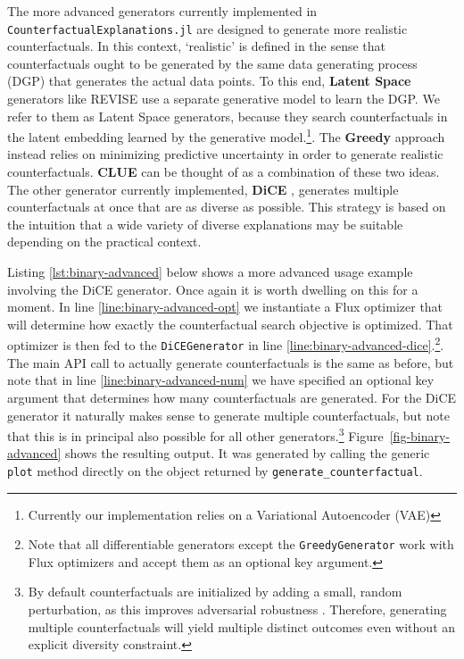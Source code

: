 \documentclass{juliacon}
\begin{document}
The more advanced generators currently implemented in
\texttt{CounterfactualExplanations.jl} are designed to generate more
realistic counterfactuals. In this context, `realistic' is defined in
the sense that counterfactuals ought to be generated by the same data
generating process (DGP) that generates the actual data points. To this
end, \textbf{Latent Space} generators like REVISE
\cite{joshi2019realistic} use a separate generative model to learn the
DGP. We refer to them as Latent Space generators, because they search
counterfactuals in the latent embedding learned by the generative
model.\footnote{Currently our implementation relies on a Variational
  Autoencoder (VAE)}. The \textbf{Greedy} approach
\cite{schut2021generating} instead relies on minimizing predictive
uncertainty in order to generate realistic counterfactuals.
\textbf{CLUE} \cite{antoran2020getting} can be thought of as a
combination of these two ideas. The other generator currently
implemented, \textbf{DiCE} \cite{mothilal2020explaining}, generates
multiple counterfactuals at once that are as diverse as possible. This
strategy is based on the intuition that a wide variety of diverse
explanations may be suitable depending on the practical context.

Listing \ref{lst:binary-advanced} below shows a more advanced usage
example involving the DiCE generator. Once again it is worth dwelling on
this for a moment. In line \ref{line:binary-advanced-opt} we instantiate
a Flux optimizer that will determine how exactly the counterfactual
search objective is optimized. That optimizer is then fed to the
\texttt{DiCEGenerator} in line
\ref{line:binary-advanced-dice}.\footnote{Note that all differentiable
  generators except the \texttt{GreedyGenerator} work with Flux
  optimizers and accept them as an optional key argument.}. The main API
call to actually generate counterfactuals is the same as before, but
note that in line \ref{line:binary-advanced-num} we have specified an
optional key argument that determines how many counterfactuals are
generated. For the DiCE generator it naturally makes sense to generate
multiple counterfactuals, but note that this is in principal also
possible for all other generators.\footnote{By default counterfactuals
  are initialized by adding a small, random perturbation, as this
  improves adversarial robustness \cite{slack2021counterfactual}.
  Therefore, generating multiple counterfactuals will yield multiple
  distinct outcomes even without an explicit diversity constraint.}
Figure~\ref{fig-binary-advanced} shows the resulting output. It was
generated by calling the generic \texttt{plot} method directly on the
object returned by \texttt{generate\_counterfactual}.
\end{document}
